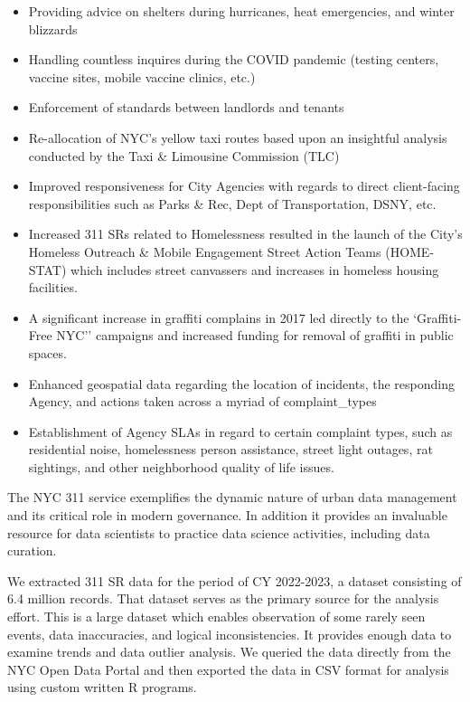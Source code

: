 \documentclass[12pt, titlepage]{article}
\begin{document}
\begin{itemize}
	\item Providing advice on shelters during hurricanes, heat emergencies, and winter blizzards
	\item Handling countless inquires during the COVID pandemic (testing centers, vaccine sites, mobile vaccine clinics, etc.)
	\item Enforcement of standards between landlords and tenants
	\item Re-allocation of NYC's yellow taxi routes based upon an insightful analysis conducted by the Taxi \& Limousine Commission (TLC)
	\item Improved responsiveness for City Agencies with regards to direct client-facing responsibilities such as Parks \& Rec, Dept of Transportation, DSNY, etc.
	\item Increased 311 SRs related to Homelessness resulted in the launch of the City's Homeless Outreach \& Mobile Engagement Street Action Teams (HOME-STAT)
	which includes street canvassers and increases in homeless housing facilities.
	\item A significant increase in graffiti complains in 2017 led directly to the `Graffiti-Free NYC'' campaigns and increased funding for removal of graffiti in public spaces.
	\item Enhanced geospatial data regarding the location of incidents, the responding Agency, and actions taken across a myriad of complaint\_types
	\item Establishment of Agency SLAs in regard to certain complaint types, such as residential noise, homelessness person assistance, street light outages, 
	rat sightings, and other neighborhood quality of life issues.
\end{itemize}

The NYC 311 service exemplifies the dynamic nature of urban data
management and its critical role in modern governance. In addition it provides an
invaluable resource for data scientists to practice data science activities, including data curation.

We extracted 311 SR data for the period of CY 2022-2023, a dataset consisting of
6.4 million records. That dataset serves as the primary source for the analysis effort. This is a large dataset which enables 
observation of some rarely seen events, data inaccuracies, and logical inconsistencies. It provides enough data to examine trends and data outlier analysis. 
We queried the data directly from the NYC Open Data Portal and then exported the data in CSV format for analysis using custom written R programs.
\end{document}
